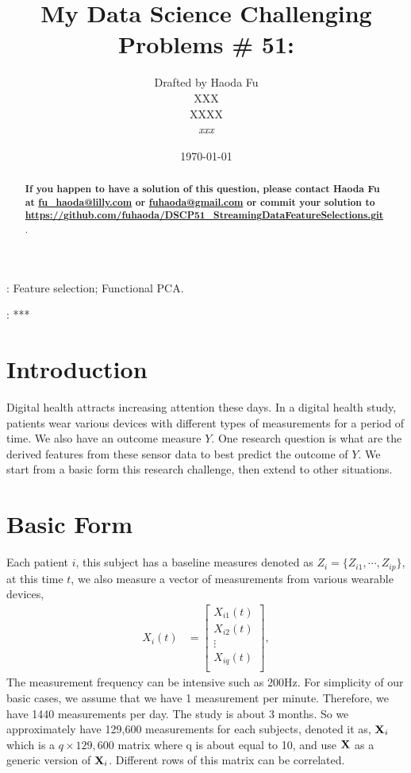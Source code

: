\documentclass[12pt]{article}
\def\bX{{\bf X}}
\begin{document}
\title
{\bf My Data Science Challenging Problems \# 51: }
\author
{
Drafted by Haoda Fu\\
XXX \\
XXXX \\
\textsl{xxx} }
\date{\today}

\maketitle
\begin{abstract}
\textbf{{\color[rgb]{1,0,0} If you happen to have a solution of this question, please contact Haoda Fu at \href{mailto:fu\_haoda@lilly.com }{fu\_haoda@lilly.com} or  \href{mailto:ffuhaoda@gmail.com}{fuhaoda@gmail.com}  or commit your solution to \url{https://github.com/fuhaoda/DSCP51_StreamingDataFeatureSelections.git} }
}. 

\end{abstract}
: Feature selection; Functional PCA.

: ***
\section{Introduction}
Digital health attracts increasing attention these days. In a digital health study,  patients wear various devices with different types of measurements for a period of time. We also have an outcome measure $Y$. One research question is what are the derived features from these sensor data to best predict the outcome of $Y$. We start from a basic form this research challenge, then extend to other situations.
\section{Basic Form}
Each patient $i$, this subject has a baseline measures denoted as $Z_i=\{Z_{i1}, \cdots, Z_{ip}\}$, at this time $t$, we also measure a vector of measurements from various wearable devices,
\begin{align*}
X_i(t)&=\left[\begin{array}{c}
X_{i1}(t)	\\
X_{i2}(t)	\\
\vdots	\\
X_{iq}(t)	\\
\end{array}\right],
\end{align*}
The measurement frequency can be intensive such as 200Hz. For simplicity of our basic cases, we assume that we have 1 measurement per minute. Therefore, we have 1440 measurements per day. The study is about 3 months. So we approximately have 129,600 measurements for each subjects, denoted it as, $\bX_i$ which is a $q \times 129,600$ matrix where q is about equal to 10, and use $\bX$ as a generic version of $\bX_i$. Different rows of this matrix can be correlated. 
\end{document}
